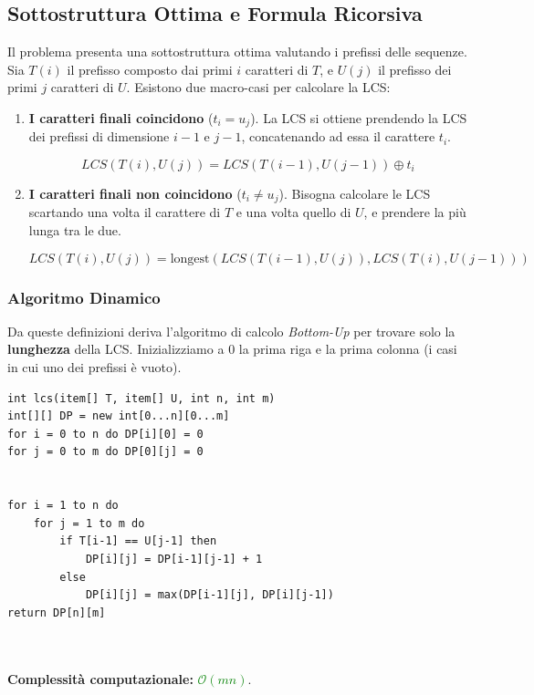 \documentclass[12pt, a4paper]{article}
\begin{document}
\subsection{Sottostruttura Ottima e Formula Ricorsiva}
Il problema presenta una sottostruttura ottima valutando i prefissi delle sequenze. Sia $T(i)$ il prefisso composto dai primi $i$ caratteri di $T$, e $U(j)$ il prefisso dei primi $j$ caratteri di $U$.
Esistono due macro-casi per calcolare la LCS:
\begin{enumerate}
\item \textbf{I caratteri finali coincidono} ($t_i = u_j$).
La LCS si ottiene prendendo la LCS dei prefissi di dimensione $i-1$ e $j-1$, concatenando ad essa il carattere $t_i$.


$$LCS(T(i), U(j)) = LCS(T(i-1), U(j-1)) \oplus t_i$$


\item \textbf{I caratteri finali non coincidono} ($t_i \neq u_j$).
Bisogna calcolare le LCS scartando una volta il carattere di $T$ e una volta quello di $U$, e prendere la più lunga tra le due.


$$LCS(T(i), U(j)) = \text{longest}(LCS(T(i-1), U(j)), LCS(T(i), U(j-1)))$$


\end{enumerate}

\subsubsection{Algoritmo Dinamico}
Da queste definizioni deriva l'algoritmo di calcolo \textit{Bottom-Up} per trovare solo la \textbf{lunghezza} della LCS. Inizializziamo a $0$ la prima riga e la prima colonna (i casi in cui uno dei prefissi è vuoto).

\begin{verbatim}
int lcs(item[] T, item[] U, int n, int m)
int[][] DP = new int[0...n][0...m]
for i = 0 to n do DP[i][0] = 0
for j = 0 to m do DP[0][j] = 0


for i = 1 to n do
    for j = 1 to m do
        if T[i-1] == U[j-1] then
            DP[i][j] = DP[i-1][j-1] + 1
        else
            DP[i][j] = max(DP[i-1][j], DP[i][j-1])
return DP[n][m]



\end{verbatim}
\textbf{Complessità computazionale:} \textcolor{green}{$\mathcal{O}(mn)$}.
\end{document}
